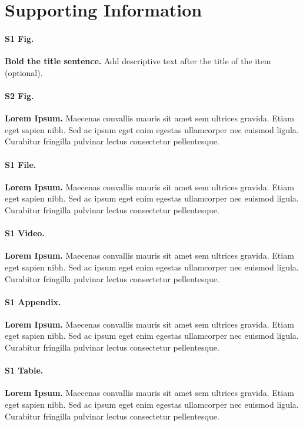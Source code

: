 \documentclass[10pt,letterpaper]{article}
\begin{document}
\section*{Supporting Information}

\paragraph*{S1 Fig.}
\label{S1_Fig}
{\bf Bold the title sentence.} Add descriptive text after the title of the item (optional).

\paragraph*{S2 Fig.}
\label{S2_Fig}
{\bf Lorem Ipsum.} Maecenas convallis mauris sit amet sem ultrices gravida. Etiam eget sapien nibh. Sed ac ipsum eget enim egestas ullamcorper nec euismod ligula. Curabitur fringilla pulvinar lectus consectetur pellentesque.

\paragraph*{S1 File.}
\label{S1_File}
{\bf Lorem Ipsum.}  Maecenas convallis mauris sit amet sem ultrices gravida. Etiam eget sapien nibh. Sed ac ipsum eget enim egestas ullamcorper nec euismod ligula. Curabitur fringilla pulvinar lectus consectetur pellentesque.

\paragraph*{S1 Video.}
\label{S1_Video}
{\bf Lorem Ipsum.}  Maecenas convallis mauris sit amet sem ultrices gravida. Etiam eget sapien nibh. Sed ac ipsum eget enim egestas ullamcorper nec euismod ligula. Curabitur fringilla pulvinar lectus consectetur pellentesque.

\paragraph*{S1 Appendix.}
\label{S1_Appendix}
{\bf Lorem Ipsum.} Maecenas convallis mauris sit amet sem ultrices gravida. Etiam eget sapien nibh. Sed ac ipsum eget enim egestas ullamcorper nec euismod ligula. Curabitur fringilla pulvinar lectus consectetur pellentesque.

\paragraph*{S1 Table.}
\label{S1_Table}
{\bf Lorem Ipsum.} Maecenas convallis mauris sit amet sem ultrices gravida. Etiam eget sapien nibh. Sed ac ipsum eget enim egestas ullamcorper nec euismod ligula. Curabitur fringilla pulvinar lectus consectetur pellentesque.
\end{document}
